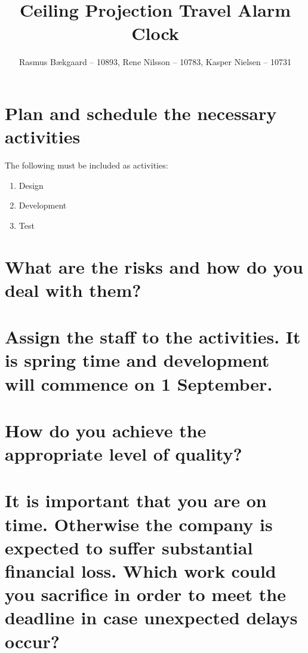 \documentclass[10pt, a4]{article}
\title{Ceiling Projection Travel Alarm Clock}
\author{Rasmus Bækgaard -- 10893, Rene Nilsson -- 10783, Kasper Nielsen -- 10731}
\begin{document}
\maketitle


\section{Plan and schedule the necessary activities} 

The following must be included as activities:
\begin{enumerate}
	\item Design
	\item Development
	\item Test
\end{enumerate}



\section{What are the risks and how do you deal with them?}



\section{Assign the staff to the activities. It is spring time and development will commence on 1 September.}



\section{How do you achieve the appropriate level of quality?}



\section{It is important that you are on time. 
Otherwise the company is expected to suffer substantial financial loss. 
	Which work could you sacrifice in order to meet the deadline in case unexpected delays occur?}
\end{document}
